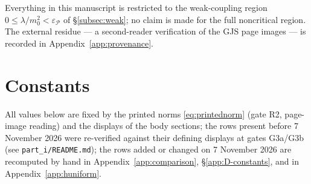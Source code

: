 \documentclass[11pt,a4paper]{article}
\theoremstyle{plain}
\theoremstyle{definition}
\theoremstyle{plain}
\theoremstyle{definition}
\begin{document}
Everything in this manuscript is restricted to the weak-coupling region
$0\le\lambda/m_0^2<\varepsilon_{\mathscr P}$ of \S\ref{subsec:weak}; no claim is made for
the full noncritical region. The external residue --- a second-reader verification of the
GJS page images --- is recorded in Appendix~\ref{app:provenance}.

\appendix

\section{Constants}\label{app:constants}

All values below are fixed by the printed norms \eqref{eq:printednorm} (gate R2, page-image
reading) and the displays of the body sections; the rows present before 7 November 2026 were
re-verified against their defining displays at gates G3a/G3b (see \texttt{part\_i/README.md});
the rows added or changed on 7 November 2026 are recomputed by hand in
Appendix~\ref{app:comparison}, \S\ref{app:D-constants}, and in Appendix~\ref{app:huniform}.
\end{document}
